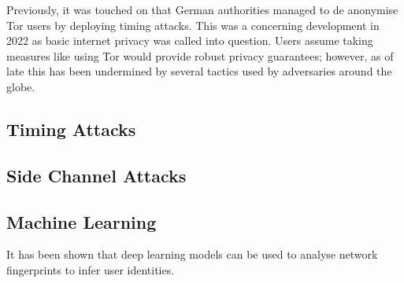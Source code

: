 Previously, it was touched on that German authorities managed to de anonymise Tor users by deploying timing attacks. This was a concerning development in 2022 as basic internet privacy was called into question. Users assume taking measures like using Tor would provide robust privacy guarantees; however, as of late this has been undermined by several tactics used by adversaries around the globe. 
 
\subsection{Timing Attacks}
 
 
\subsection{Side Channel Attacks}
 
 
\subsection{Machine Learning}
It has been shown that deep learning models can be used to analyse network fingerprints to infer user identities.

